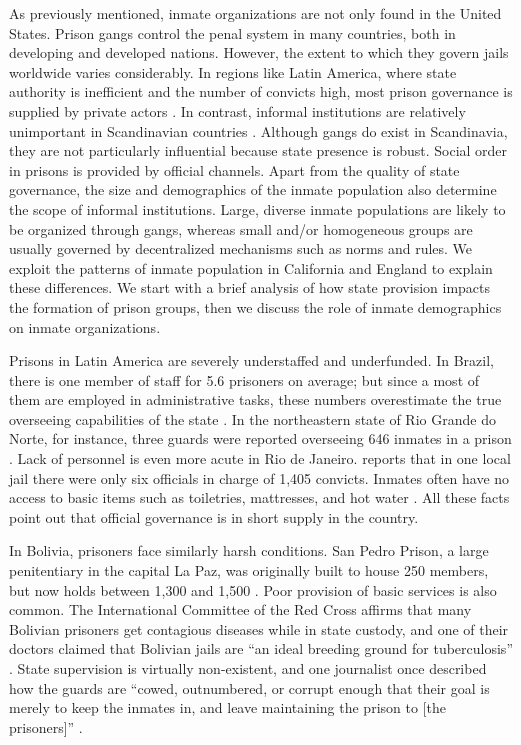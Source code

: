 \documentclass[a4paper, 12pt]{article}
\begin{document}
\noindent
As previously mentioned, inmate organizations are not only found in the United States. Prison gangs control the penal system in many countries, both in developing and developed nations. However, the extent to which they govern jails worldwide varies considerably. In regions like Latin America, where state authority is inefficient and the number of convicts high, most prison governance is supplied by private actors \citep{biondi2010junto,darke2013inmate,dias2009guerra,lessing2014build,skarbek2010self}. In contrast, informal institutions are relatively unimportant in Scandinavian countries \citep{larsson2011svensk,pratt2008scandinavian}. Although gangs do exist in Scandinavia, they are not particularly influential because state presence is robust. Social order in prisons is provided by official channels. Apart from the quality of state governance, the size and demographics of the inmate population also determine the scope of informal institutions. Large, diverse inmate populations are likely to be organized through gangs, whereas small and/or homogeneous groups are usually governed by decentralized mechanisms such as norms and rules. We exploit the patterns of inmate population in California and England to explain these differences. We start with a brief analysis of how state provision impacts the formation of prison groups, then we discuss the role of inmate demographics on inmate organizations.

Prisons in Latin America are severely understaffed and underfunded. In Brazil, there is one member of staff for 5.6 prisoners on average; but since a most of them are employed in administrative tasks, these numbers overestimate the true overseeing capabilities of the state \citep[p. 100]{mariner1998behind}. In the northeastern state of Rio Grande do Norte, for instance, three guards were reported overseeing 646 inmates in a prison \citep[p. 102]{mariner1998behind}. Lack of personnel is even more acute in Rio de Janeiro. \citet[p. 275]{darke2013inmate} reports that in one local jail there were only six officials in charge of 1,405 convicts. Inmates often have no access to basic items such as toiletries, mattresses, and hot water \citep[p. 65]{cnmp2013}. All these facts point out that official governance is in short supply in the country.

In Bolivia, prisoners face similarly harsh conditions. San Pedro Prison, a large penitentiary in the capital La Paz, was originally built to house 250 members, but now holds between 1,300 and 1,500 \citep{bbc2009carcel,cerbini2012sanpedro}. Poor provision of basic services is also common. The International Committee of the Red Cross affirms that many Bolivian prisoners get contagious diseases while in state custody, and one of their doctors claimed that Bolivian jails are ``an ideal breeding ground for tuberculosis'' \citep{vuilleumier2010latin}. State supervision is virtually non-existent, and one journalist once described how the guards are ``cowed, outnumbered, or corrupt enough that their goal is merely to keep the inmates in, and leave maintaining the prison to [the prisoners]'' \citep{gassaway2004san}. 
\end{document}
